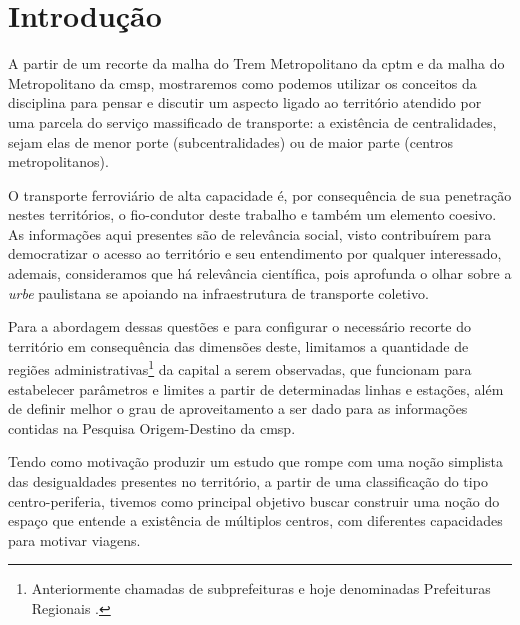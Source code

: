 	
	\tableofcontents 
	\textual
	
	\chapter{Introdução}
		
	A partir de um recorte da malha do Trem Metropolitano da \gls{cptm} e da malha do Metropolitano da \gls{cmsp}, mostraremos como podemos utilizar os conceitos da disciplina para pensar e discutir um aspecto ligado ao território atendido por uma parcela do serviço massificado de transporte: a existência de centralidades, sejam elas de menor porte (subcentralidades) ou de maior parte (centros metropolitanos).
	
	O transporte ferroviário de alta capacidade é, por consequência de sua penetração nestes territórios, o fio-condutor deste trabalho e também um elemento coesivo. As informações aqui presentes são de relevância social, visto contribuírem para democratizar o acesso ao território e seu entendimento por qualquer interessado, ademais, consideramos que há relevância científica, pois aprofunda o olhar sobre a \textit{urbe} paulistana se apoiando na infraestrutura de transporte coletivo.
	
	Para a abordagem dessas questões e para configurar o necessário recorte do território em consequência das dimensões deste, limitamos a quantidade de regiões administrativas\footnote{Anteriormente chamadas de subprefeituras e hoje denominadas Prefeituras Regionais \cite{subprefs}.} da capital a serem observadas, que funcionam para estabelecer parâmetros e limites a partir de determinadas linhas e estações, além de definir melhor o grau de aproveitamento a ser dado para as informações contidas na Pesquisa Origem-Destino da \gls{cmsp}.
	
	
	Tendo como motivação produzir um estudo que rompe com uma noção simplista das desigualdades presentes no território, a partir de uma classificação do tipo centro-periferia, tivemos como principal objetivo buscar construir uma noção do espaço que entende a existência de múltiplos centros, com diferentes capacidades para motivar viagens.
		
